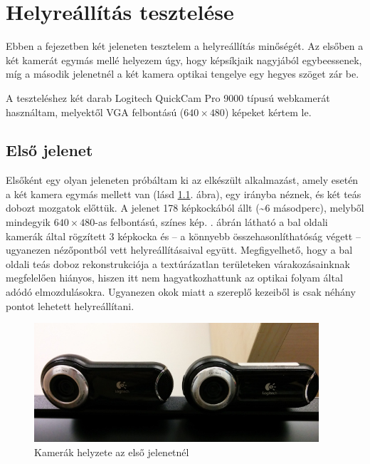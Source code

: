 \chapter{Helyreállítás tesztelése}

Ebben a fejezetben két jeleneten tesztelem a helyreállítás minőségét. Az elsőben a két kamerát egymás mellé helyezem úgy, hogy képsíkjaik nagyjából egybeessenek, míg a második jelenetnél a két kamera optikai tengelye egy hegyes szöget zár be.

A teszteléshez két darab Logitech QuickCam Pro 9000 típusú webkamerát használtam, melyektől VGA felbontású ($640\times 480$) képeket kértem le.

\section{Első jelenet}

Elsőként egy olyan jeleneten próbáltam ki az elkészült alkalmazást, amely esetén a két kamera egymás mellett van (lásd \ref{fig:scene1_camerapose}. ábra), egy irányba néznek, és két teás dobozt mozgatok előttük. A jelenet 178 képkockából állt (\textasciitilde 6 másodperc), melyből mindegyik $640\times 480$-as felbontású, színes kép. . ábrán látható a bal oldali kamerák által rögzített 3 képkocka és -- a könnyebb összehasonlíthatóság végett -- ugyanezen nézőpontból vett helyreállításaival együtt. Megfigyelhető, hogy a bal oldali teás doboz rekonstrukciója a textúrázatlan területeken várakozásainknak megfelelően hiányos, hiszen itt nem hagyatkozhattunk az optikai folyam által adódó elmozdulásokra. Ugyanezen okok miatt a szereplő kezeiből is csak néhány pontot lehetett helyreállítani.

\begin{figure}[tbh]
\centering
\includegraphics[width=300pt]{figures/scene1_camerapose.jpg}
\caption{Kamerák helyzete az első jelenetnél \label{fig:scene1_camerapose}}
\end{figure}

